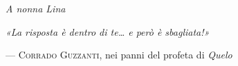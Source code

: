 %

\clearpage
\thispagestyle{empty}
\vspace*{0.32\textheight}

\begin{flushright}
  {\large\itshape A nonna Lina}
\end{flushright}

\clearpage
\thispagestyle{empty}
\vspace*{0.32\textheight}

\begin{flushright}
\begin{minipage}{0.74\textwidth}
\raggedleft
{\itshape «La risposta è dentro di te\dots{} e però è sbagliata!»}

\vspace{5mm}
--- \textsc{Corrado Guzzanti}, nei panni del profeta di \emph{Quelo}

\end{minipage}
\end{flushright}

\clearpage
